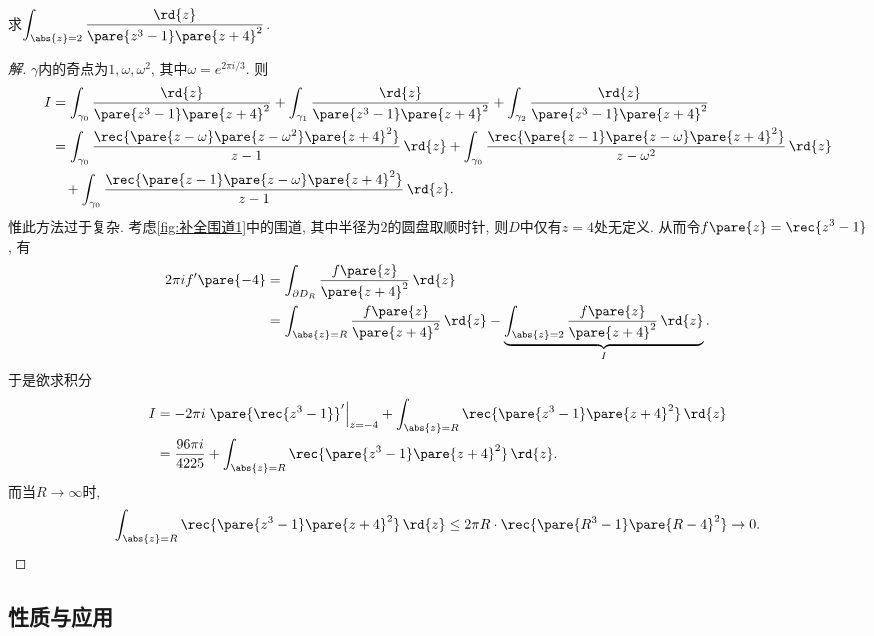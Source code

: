\documentclass[../ComplexVariable.tex]{subfiles}
\begin{document}
\begin{sample}
    \begin{ex}
        \label{ex:补全围道示意}
        求$\displaystyle \int_{\abs{z}=2} \frac{\rd{z}}{\pare{z^3-1}\pare{z+4}^2}$.
    \end{ex}
    \begin{proof}[解]
        $\gamma$内的奇点为$1,\omega,\omega^2$, 其中$\omega = e^{2\pi i/3}$. 则
        \begin{align*}
            I &= \int_{\gamma_0} \frac{\rd{z}}{\pare{z^3-1}\pare{z+4}^2} + \int_{\gamma_1} \frac{\rd{z}}{\pare{z^3-1}\pare{z+4}^2} + \int_{\gamma_2} \frac{\rd{z}}{\pare{z^3-1}\pare{z+4}^2} \\
            &= \int_{\gamma_0} \frac{\rec{\pare{z-\omega}\pare{z-\omega^2}\pare{z+4}^2}}{z-1}\,\rd{z} + \int_{\gamma_0} \frac{\rec{\pare{z-1}\pare{z-\omega}\pare{z+4}^2}}{z-\omega^2}\,\rd{z} \\ &\phantom{=}\, + \int_{\gamma_0} \frac{\rec{\pare{z-1}\pare{z-\omega}\pare{z+4}^2}}{z-1}\,\rd{z}.
        \end{align*}
        惟此方法过于复杂. 考虑\cref{fig:补全围道1}中的围道, 其中半径为$2$的圆盘取顺时针, 则$D$中仅有$z=4$处无定义. 从而令$f\pare{z} = \displaystyle \rec{z^3-1}$, 有
        \begin{align*}
            2\pi if'\pare{-4} &= \int_{\partial D_R} \frac{f\pare{z}}{\pare{z+4}^2}\,\rd{z} \\
            &= \int_{\abs{z}=R} \frac{f\pare{z}}{\pare{z+4}^2}\,\rd{z} - \underbrace{\int_{\abs{z}=2} \frac{f\pare{z}}{\pare{z+4}^2}\,\rd{z}}_{I}.
        \end{align*}
        于是欲求积分
        \begin{align*}
            I &= -2\pi i \left.\pare{\rec{z^3-1}}'\right\vert_{z=-4} + \int_{\abs{z}=R} \rec{\pare{z^3-1}\pare{z+4}^2}\,\rd{z} \\
            &= \frac{96\pi i}{4225} + \int_{\abs{z}=R} \rec{\pare{z^3-1}\pare{z+4}^2}\,\rd{z}.
        \end{align*}
        而当$R\rightarrow \infty$时,
        \[ \int_{\abs{z}=R} \rec{\pare{z^3-1}\pare{z+4}^2}\,\rd{z} \le 2\pi R \cdot \rec{\pare{R^3-1}\pare{R-4}^2} \rightarrow 0. \qedhere \]
    \end{proof}
\end{sample}



\subsection{性质与应用} %
\label{sub:性质与应用}
\end{document}
